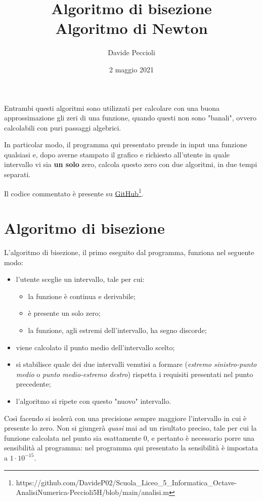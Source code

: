 \documentclass[a4paper]{article}
\title{Algoritmo di bisezione \\ Algoritmo di Newton}
\date{2 maggio 2021}
\author{Davide Peccioli}
\begin{document}
\maketitle

Entrambi questi algoritmi sono utilizzati per calcolare con una buona approssimazione gli zeri di una funzione, quando questi non sono "banali", ovvero calcolabili con puri passaggi algebrici.

In particolar modo, il programma qui presentato prende in input una funzione qualsiasi e, dopo averne stampato il grafico e richiesto all'utente in quale intervallo vi sia \textbf{un solo} zero, calcola questo zero con due algoritmi, in due tempi separati.

Il codice commentato è presente su \href{https://github.com/DavideP02/Scuola_Liceo_5_Informatica_Octave-AnalisiNumerica-Peccioli5H/blob/main/analisi.m}{GitHub}\footnote{https://github.com/DavideP02/Scuola\_Liceo\_5\_Informatica\_Octave-AnalisiNumerica-Peccioli5H/blob/main/analisi.m}.

\section{Algoritmo di bisezione}

L'algoritmo di bisezione, il primo eseguito dal programma, funziona nel seguente modo:
\begin{itemize}
    \item l'utente sceglie un intervallo, tale per cui:
    \begin{itemize}
        \item la funzione è continua e derivabile;
        \item è presente un solo zero;
        \item la funzione, agli estremi dell'intervallo, ha segno discorde;
    \end{itemize}
    \item viene calcolato il punto medio dell'intervallo scelto;
    \item si stabilisce quale dei due intervalli venutisi a formare (\textit{estremo sinistro-punto medio} o \textit{punto medio-estremo destro}) rispetta i requisiti presentati nel punto precedente;
    \item l'algoritmo si ripete con questo "nuovo" intervallo.
\end{itemize}

Così facendo si isolerà con una precisione sempre maggiore l'intervallo in cui è presente lo zero. Non si giungerà \textit{quasi} mai ad un risultato preciso, tale per cui la funzione calcolata nel punto sia esattamente $0$, e pertanto è necessario porre una sensibilità al programma: nel programma qui presentato la sensibilità è impostata a $1\cdot 10^{-15}$.
\end{document}
